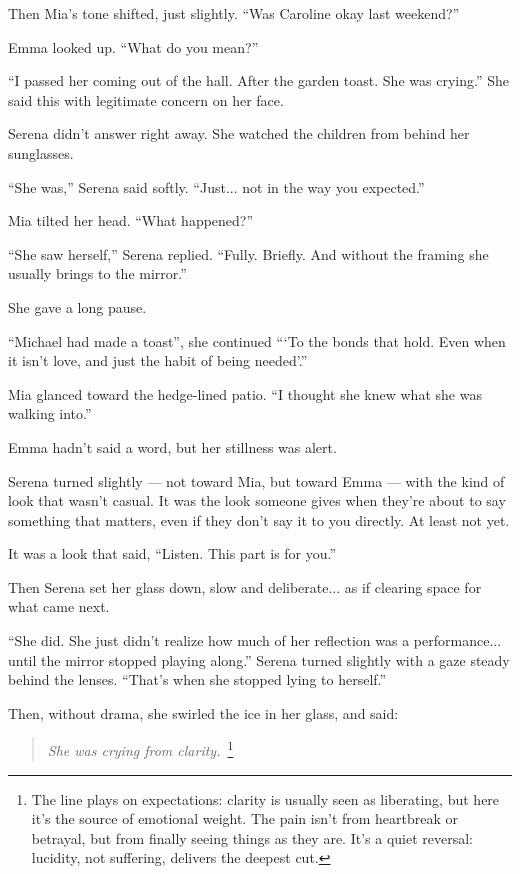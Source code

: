 Then Mia’s tone shifted, just slightly. ``Was Caroline okay last weekend?''

Emma looked up. ``What do you mean?''

``I passed her coming out of the hall. After the garden toast. She was crying.'' She said this with legitimate 
concern on her face.

Serena didn’t answer right away. She watched the children from behind her sunglasses.

``She was,'' Serena said softly. ``Just... not in the way you expected.''

Mia tilted her head. ``What happened?''

``She saw herself,'' Serena replied. ``Fully. Briefly. And without the framing she usually brings to 
the mirror.''

She gave a long pause.

``Michael had made a toast'', she continued 
```To the bonds that hold. Even when it isn’t love, and just the habit of being needed'.''

Mia glanced toward the hedge-lined patio. ``I thought she knew what she was walking into.''

Emma hadn’t said a word, but her stillness was alert.

Serena turned slightly — not toward Mia, but toward Emma — with the kind of look that wasn’t casual.
It was the look someone gives when they’re about to say something that matters, even if they don’t say it to you directly.
At least not yet.

It was a look that said, ``Listen. This part is for you.''

Then Serena set her glass down, slow and deliberate... as if clearing space for what came next.

``She did. She just didn’t realize how much of her reflection was a performance... until the mirror 
stopped playing along.'' Serena turned slightly with a gaze steady behind the lenses. ``That’s when 
she stopped lying to herself.''

Then, without drama, she swirled the ice in her glass, and said:

\begin{quote}
\centering
\textit{She was crying from clarity.}\ 
\footnote{The line plays on
expectations: clarity is usually seen as liberating, but here it’s the source of emotional weight. The pain
isn't from heartbreak or betrayal, but from finally seeing things as they are. It's a quiet reversal: lucidity,
not suffering, delivers the deepest cut.}
\end{quote}

